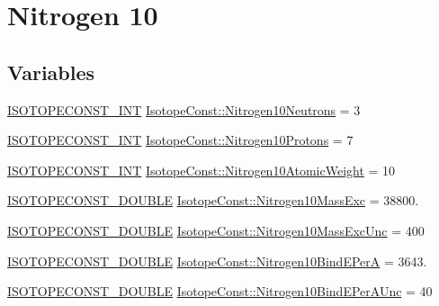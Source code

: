 \hypertarget{group___isotope_const-_nitrogen-_n10}{}\section{Nitrogen 10}
\label{group___isotope_const-_nitrogen-_n10}
\subsection*{Variables}
\begin{DoxyCompactItemize}
\item 
\mbox{\hyperlink{group___isotope_const-_macros_ga5f18360b3e99483a35c32d789e62621c}{I\+S\+O\+T\+O\+P\+E\+C\+O\+N\+S\+T\+\_\+\+I\+NT}} \mbox{\hyperlink{group___isotope_const-_nitrogen-_n10_ga641e219ef116bca2ff33b00964110efe}{Isotope\+Const\+::\+Nitrogen10\+Neutrons}} = 3
\item 
\mbox{\hyperlink{group___isotope_const-_macros_ga5f18360b3e99483a35c32d789e62621c}{I\+S\+O\+T\+O\+P\+E\+C\+O\+N\+S\+T\+\_\+\+I\+NT}} \mbox{\hyperlink{group___isotope_const-_nitrogen-_n10_ga22dc3e26f8d736121fa41d24dacdaf8a}{Isotope\+Const\+::\+Nitrogen10\+Protons}} = 7
\item 
\mbox{\hyperlink{group___isotope_const-_macros_ga5f18360b3e99483a35c32d789e62621c}{I\+S\+O\+T\+O\+P\+E\+C\+O\+N\+S\+T\+\_\+\+I\+NT}} \mbox{\hyperlink{group___isotope_const-_nitrogen-_n10_ga45b0755636b58c8fc0fd3acde24c2d6b}{Isotope\+Const\+::\+Nitrogen10\+Atomic\+Weight}} = 10
\item 
\mbox{\hyperlink{group___isotope_const-_macros_ga8f45a7272ce02c0b4c65c44636ed719a}{I\+S\+O\+T\+O\+P\+E\+C\+O\+N\+S\+T\+\_\+\+D\+O\+U\+B\+LE}} \mbox{\hyperlink{group___isotope_const-_nitrogen-_n10_ga37858a327ddc33b323dabadbec672804}{Isotope\+Const\+::\+Nitrogen10\+Mass\+Exc}} = 38800.
\item 
\mbox{\hyperlink{group___isotope_const-_macros_ga8f45a7272ce02c0b4c65c44636ed719a}{I\+S\+O\+T\+O\+P\+E\+C\+O\+N\+S\+T\+\_\+\+D\+O\+U\+B\+LE}} \mbox{\hyperlink{group___isotope_const-_nitrogen-_n10_ga46e2b51447aa5140189a9566fc13c992}{Isotope\+Const\+::\+Nitrogen10\+Mass\+Exc\+Unc}} = 400
\item 
\mbox{\hyperlink{group___isotope_const-_macros_ga8f45a7272ce02c0b4c65c44636ed719a}{I\+S\+O\+T\+O\+P\+E\+C\+O\+N\+S\+T\+\_\+\+D\+O\+U\+B\+LE}} \mbox{\hyperlink{group___isotope_const-_nitrogen-_n10_ga85e033f0bfc50f685e1adc9ad84bca3b}{Isotope\+Const\+::\+Nitrogen10\+Bind\+E\+PerA}} = 3643.
\item 
\mbox{\hyperlink{group___isotope_const-_macros_ga8f45a7272ce02c0b4c65c44636ed719a}{I\+S\+O\+T\+O\+P\+E\+C\+O\+N\+S\+T\+\_\+\+D\+O\+U\+B\+LE}} \mbox{\hyperlink{group___isotope_const-_nitrogen-_n10_ga72f811797478934deb06831485c2b166}{Isotope\+Const\+::\+Nitrogen10\+Bind\+E\+Per\+A\+Unc}} = 40

\end{DoxyCompactItemize}
